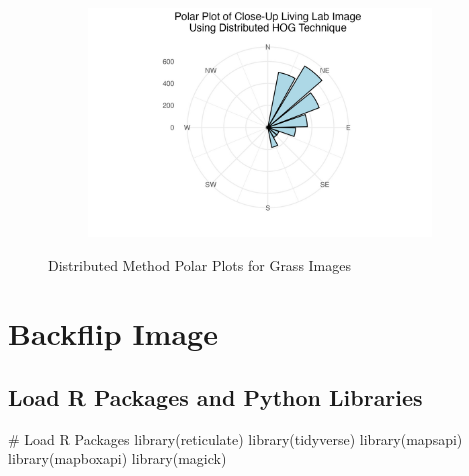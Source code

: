 \documentclass[
  letterpaper,
  DIV=11,
  numbers=noendperiod]{scrreprt}
\newenvironment{Shaded}{\begin{snugshade}}{\end{snugshade}}
\newcommand{\CommentTok}[1]{\textcolor[rgb]{0.37,0.37,0.37}{#1}}
\newcommand{\FunctionTok}[1]{\textcolor[rgb]{0.28,0.35,0.67}{#1}}
\newcommand{\NormalTok}[1]{\textcolor[rgb]{0.00,0.23,0.31}{#1}}
\begin{document}
\begin{figure}
\begin{minipage}{0.33\linewidth}
\begin{figure}[H]
{}


\end{figure}%

\end{minipage}%
%
\begin{minipage}{0.33\linewidth}

\begin{figure}[H]

{\centering \includegraphics{images/plots/grass/close_up_living_lab_contribution_polar_plot.jpg}

}


\end{figure}%

\end{minipage}%

\caption{\label{fig-grass-distributed-polar}Distributed Method Polar
Plots for Grass Images}

\end{figure}%

\chapter{Backflip Image}\label{backflip-image}

\section{Load R Packages and Python
Libraries}\label{load-r-packages-and-python-libraries-2}

\begin{Shaded}
\begin{Highlighting}[]
\CommentTok{\# Load R Packages}
\FunctionTok{library}\NormalTok{(reticulate)}
\FunctionTok{library}\NormalTok{(tidyverse)}
\FunctionTok{library}\NormalTok{(mapsapi)}
\FunctionTok{library}\NormalTok{(mapboxapi)}
\FunctionTok{library}\NormalTok{(magick)}
\end{Highlighting}
\end{Shaded}
\end{document}
